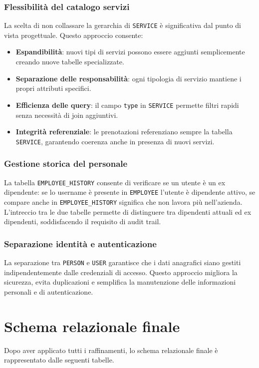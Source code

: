 \documentclass[a4paper,12pt]{report}
\begin{document}
\subsubsection{Flessibilità del catalogo servizi}
La scelta di non collassare la gerarchia di \texttt{SERVICE} è
significativa dal punto di vista progettuale. Questo approccio consente:

\begin{itemize}
  \item \textbf{Espandibilità}: nuovi tipi di servizi possono essere
    aggiunti semplicemente creando nuove tabelle specializzate.
  \item \textbf{Separazione delle responsabilità}: ogni tipologia di
    servizio mantiene i propri attributi specifici.
  \item \textbf{Efficienza delle query}: il campo \texttt{type} in
    \texttt{SERVICE} permette filtri rapidi senza necessità di join aggiuntivi.
  \item \textbf{Integrità referenziale}: le prenotazioni referenziano
    sempre la tabella \texttt{SERVICE}, garantendo coerenza anche in
    presenza di nuovi servizi.
\end{itemize}

\subsubsection{Gestione storica del personale}
La tabella \texttt{EMPLOYEE\_HISTORY} consente di verificare se un
utente è un ex dipendente: se lo username è presente in
\texttt{EMPLOYEE} l'utente è dipendente attivo, se compare anche in
\texttt{EMPLOYEE\_HISTORY} significa che non lavora più nell'azienda.
L'intreccio tra le due tabelle permette di distinguere tra dipendenti
attuali ed ex dipendenti, soddisfacendo il requisito di audit trail.

\subsubsection{Separazione identità e autenticazione}
La separazione tra \texttt{PERSON} e \texttt{USER} garantisce che i
dati anagrafici siano gestiti indipendentemente dalle credenziali di
accesso. Questo approccio migliora la sicurezza, evita duplicazioni e
semplifica la manutenzione delle informazioni personali e di autenticazione.

\section{Schema relazionale finale}
Dopo aver applicato tutti i raffinamenti, lo schema relazionale
finale è rappresentato dalle seguenti tabelle.
\end{document}
